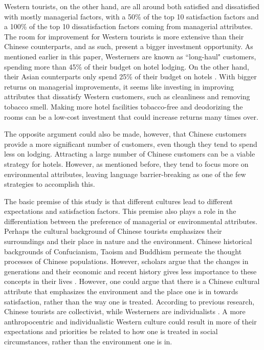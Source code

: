 \documentclass[smallextended,natbib]{svjour3}       %
\begin{document}
Western tourists, on the other hand, are all around both satisfied and dissatisfied with mostly managerial factors, with a 50\% of the top 10 satisfaction factors and a 100\% of the top 10 dissatisfaction factors coming from managerial attributes. The room for improvement for Western tourists is more extensive than their Chinese counterparts, and as such, present a bigger investment opportunity. As mentioned earlier in this paper, Westerners are known as ``long-haul" customers, spending more than 45\% of their budget on hotel lodging. On the other hand, their Asian counterparts only spend 25\% of their budget on hotels \cite{choi2000}. With bigger returns on managerial improvements, it seems like investing in improving attributes that dissatisfy Western customers, such as cleanliness and removing tobacco smell. Making more hotel facilities tobacco-free and deodorizing the rooms can be a low-cost investment that could increase returns many times over. 

The opposite argument could also be made, however, that Chinese customers provide a more significant number of customers, even though they tend to spend less on lodging. Attracting a large number of Chinese customers can be a viable strategy for hotels. However, as mentioned before, they tend to focus more on environmental attributes, leaving language barrier-breaking as one of the few strategies to accomplish this.

The basic premise of this study is that different cultures lead to different expectations and satisfaction factors. This premise also plays a role in the differentiation between the preference of managerial or environmental attributes. Perhaps the cultural background of Chinese tourists emphasizes their surroundings and their place in nature and the environment. Chinese historical backgrounds of Confucianism, Taoism and Buddhism permeate the thought processes of Chinese populations. However, scholars argue that the changes in generations and their economic and recent history gives less importance to these concepts in their lives \cite{gao2017chinese}. However, one could argue that there is a Chinese cultural attribute that emphasizes the environment and the place one is in towards satisfaction, rather than the way one is treated. According to previous research, Chinese tourists are collectivist, while Westerners are individualists \cite{kim2000}. A more anthropocentric and individualistic Western culture could result in more of their expectations and priorities be related to how one is treated in social circumstances, rather than the environment one is in. 
\end{document}
